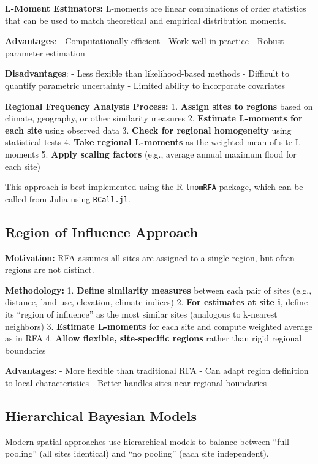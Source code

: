 \documentclass[
  letterpaper,
  DIV=11,
  numbers=noendperiod]{scrreprt}
\begin{document}
\textbf{L-Moment Estimators:} L-moments are linear combinations of order
statistics that can be used to match theoretical and empirical
distribution moments.

\textbf{Advantages}: - Computationally efficient - Work well in practice
- Robust parameter estimation

\textbf{Disadvantages}: - Less flexible than likelihood-based methods -
Difficult to quantify parametric uncertainty - Limited ability to
incorporate covariates

\textbf{Regional Frequency Analysis Process:} 1. \textbf{Assign sites to
regions} based on climate, geography, or other similarity measures 2.
\textbf{Estimate L-moments for each site} using observed data 3.
\textbf{Check for regional homogeneity} using statistical tests 4.
\textbf{Take regional L-moments} as the weighted mean of site L-moments
5. \textbf{Apply scaling factors} (e.g., average annual maximum flood
for each site)

This approach is best implemented using the R \texttt{lmomRFA} package,
which can be called from Julia using \texttt{RCall.jl}.

\subsection{Region of Influence
Approach}\label{region-of-influence-approach}

\textbf{Motivation:} RFA assumes all sites are assigned to a single
region, but often regions are not distinct.

\textbf{Methodology:} 1. \textbf{Define similarity measures} between
each pair of sites (e.g., distance, land use, elevation, climate
indices) 2. \textbf{For estimates at site i}, define its ``region of
influence'' as the most similar sites (analogous to k-nearest neighbors)
3. \textbf{Estimate L-moments} for each site and compute weighted
average as in RFA 4. \textbf{Allow flexible, site-specific regions}
rather than rigid regional boundaries

\textbf{Advantages}: - More flexible than traditional RFA - Can adapt
region definition to local characteristics - Better handles sites near
regional boundaries

\subsection{Hierarchical Bayesian
Models}\label{hierarchical-bayesian-models}

Modern spatial approaches use hierarchical models to balance between
``full pooling'' (all sites identical) and ``no pooling'' (each site
independent).
\end{document}
